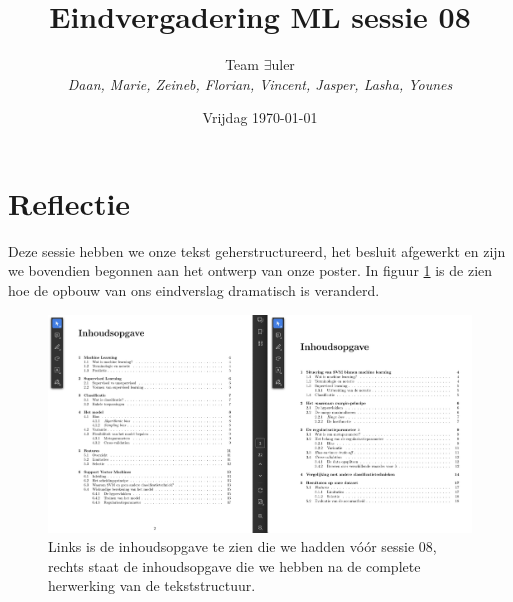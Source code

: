 \documentclass{article}
\title{Eindvergadering ML sessie 08}
\author{Team $\exists$uler\\
	\textit{Daan, Marie, Zeineb, Florian, Vincent, Jasper, Lasha, Younes}}
\date{Vrijdag \today}
\begin{document}
	
\maketitle

\section*{Reflectie}

Deze sessie hebben we onze tekst geherstructureerd, het besluit afgewerkt en zijn we bovendien begonnen aan het ontwerp van onze poster. In figuur \ref{fig:inhoudsopgave} is de zien hoe de opbouw van ons eindverslag dramatisch is veranderd.

\begin{figure}[h!]
	\includegraphics[width=.99\textwidth]{inhoudsopgave}
	\caption{Links is de inhoudsopgave te zien die we hadden vóór sessie 08, rechts staat de inhoudsopgave die we hebben na de complete herwerking van de tekststructuur.}
	\label{fig:inhoudsopgave}
\end{figure}
\end{document}
